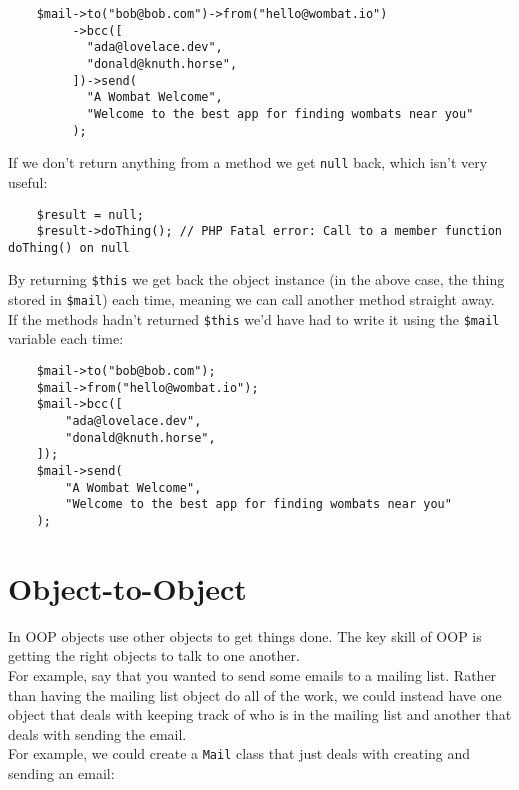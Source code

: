 \begin{verbatim}
    $mail->to("bob@bob.com")->from("hello@wombat.io")
         ->bcc([
           "ada@lovelace.dev",
           "donald@knuth.horse",
         ])->send(
           "A Wombat Welcome",
           "Welcome to the best app for finding wombats near you"
         );
\end{verbatim}

If we don't return anything from a method we get \texttt{null} back, which isn't very useful:

\begin{verbatim}
    $result = null;
    $result->doThing(); // PHP Fatal error: Call to a member function doThing() on null
\end{verbatim}

By returning \texttt{\$this} we get back the object instance (in the above case, the thing stored in \texttt{\$mail}) each time, meaning we can call another method straight away.
\\

If the methods hadn't returned \texttt{\$this} we'd have had to write it using the \texttt{\$mail} variable each time:

\begin{verbatim}
    $mail->to("bob@bob.com");
    $mail->from("hello@wombat.io");
    $mail->bcc([
        "ada@lovelace.dev",
        "donald@knuth.horse",
    ]);
    $mail->send(
        "A Wombat Welcome",
        "Welcome to the best app for finding wombats near you"
    );
\end{verbatim}



\section{Object-to-Object}

In OOP objects use other objects to get things done. The key skill of OOP is getting the right objects to talk to one another.
\\

For example, say that you wanted to send some emails to a mailing list. Rather than having the mailing list object do all of the work, we could instead have one object that deals with keeping track of who is in the mailing list and another that deals with sending the email.
\\

For example, we could create a \texttt{Mail} class that just deals with creating and sending an email:

